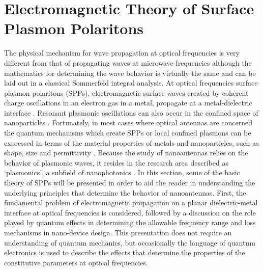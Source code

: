 \documentclass[11pt]{article}
\begin{document}
\section{Electromagnetic Theory of Surface Plasmon Polaritons}
%
The physical mechanism for wave propagation at optical frequencies is very different from that of propagating waves at microwave frequencies although the mathematics for determining the wave behavior is virtually the same and can be laid out in a classical Sommerfeld integral analysis. At optical frequencies surface plasmon polaritons (SPPs), electromagnetic surface waves created by coherent charge oscillations in an electron gas in a metal, propagate at a metal-dielectric interface \cite{Ritchie1957,otto1976spectroscopy, Raether1988}. Resonant plasmonic oscillations can also occur in the confined space of nanoparticles \cite{Nie1997}. Fortunately, in most cases where optical antennas are concerned the quantum mechanisms which create SPPs or local confined plasmons can be expressed in terms of the material properties of metals and nanoparticles, such as shape, size and permittivity \cite{Kelly2003}.  Because the study of nanoantennas relies on the behavior of
plasmonic waves, it resides in the research area described as `plasmonics', a
subfield of nanophotonics \cite{Maier2005, Park2009}. In this section, some of the basic theory of SPPs will be presented in order to aid the reader in understanding the underlying principles that determine the behavior of nanoantennas. First, the fundamental problem of electromagnetic propagation on a planar dielectric-metal interface at optical frequencies is considered, followed by a discussion on the role played by quantum effects in determining the allowable frequency range and loss mechanisms in nano-device design. This presentation does not require an understanding of quantum mechanics, but occasionally the language of quantum electronics is used to describe the effects that determine the properties of the constitutive parameters at optical frequencies.
%
%
%
%
\end{document}
